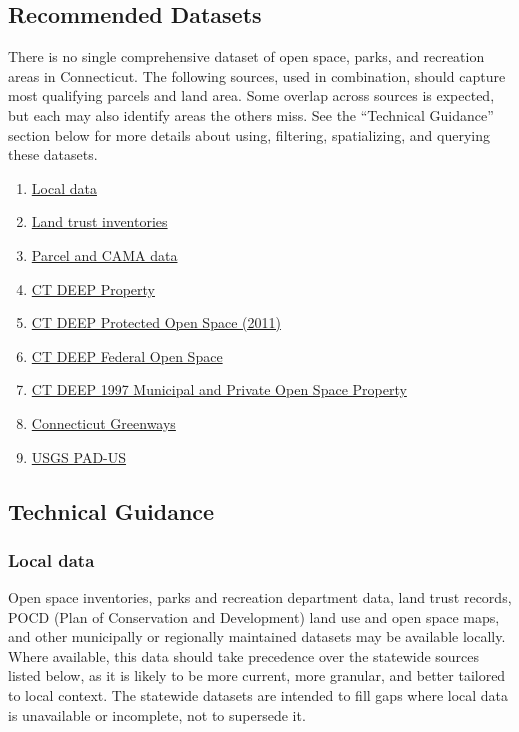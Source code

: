 \documentclass[
  letterpaper,
  DIV=11,
  numbers=noendperiod]{scrreprt}
\providecommand{\tightlist}{%
  \setlength{\itemsep}{0pt}\setlength{\parskip}{0pt}}
\begin{document}
\subsection{Recommended Datasets}\label{recommended-datasets}

There is no single comprehensive dataset of open space, parks, and
recreation areas in Connecticut. The following sources, used in
combination, should capture most qualifying parcels and land area. Some
overlap across sources is expected, but each may also identify areas the
others miss. See the ``Technical Guidance'' section below for more
details about using, filtering, spatializing, and querying these
datasets.

\begin{enumerate}
\def\labelenumi{\arabic{enumi}.}
\tightlist
\item
  \hyperref[sec-local-data2]{Local data}
\item
  \hyperref[sec-land-trust-inventories]{Land trust inventories}
\item
  \hyperref[sec-parcel-and-cama-data2]{Parcel and CAMA data}
\item
  \hyperref[sec-ct-deep-property]{CT DEEP Property}
\item
  \hyperref[sec-ct-deep-protected-open-space-2011]{CT DEEP Protected
  Open Space (2011)}
\item
  \hyperref[sec-ct-deep-federal-open-space]{CT DEEP Federal Open Space}
\item
  \hyperref[sec-ct-deep-1997-municipal-and-private-open-space-property]{CT
  DEEP 1997 Municipal and Private Open Space Property}
\item
  \hyperref[sec-greenways]{Connecticut Greenways}
\item
  \hyperref[sec-usgs-protected-areas-database-of-the-united-states]{USGS
  PAD-US}
\end{enumerate}

\subsection{Technical Guidance}\label{technical-guidance-1}

\subsubsection{Local data}\label{sec-local-data2}

Open space inventories, parks and recreation department data, land trust
records, POCD (Plan of Conservation and Development) land use and open
space maps, and other municipally or regionally maintained datasets may
be available locally. Where available, this data should take precedence
over the statewide sources listed below, as it is likely to be more
current, more granular, and better tailored to local context. The
statewide datasets are intended to fill gaps where local data is
unavailable or incomplete, not to supersede it.
\end{document}
